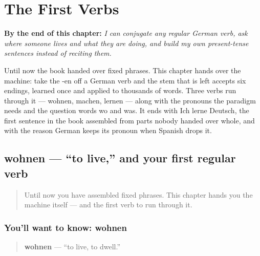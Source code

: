 
\chapter{The First Verbs}
\label{ch:first-verbs}

\begin{chapteropening}
\textbf{By the end of this chapter:} \emph{I can conjugate any regular German verb, ask where someone lives and what they are doing, and build my own present-tense sentences instead of reciting them.}

Until now the book handed over fixed phrases. This chapter hands over the machine: take the -en off a German verb and the stem that is left accepts six endings, learned once and applied to thousands of words. Three verbs run through it — wohnen, machen, lernen — along with the pronouns the paradigm needs and the question words wo and was. It ends with Ich lerne Deutsch, the first sentence in the book assembled from parts nobody handed over whole, and with the reason German keeps its pronoun when Spanish drops it.
\end{chapteropening}

\section[wohnen]{wohnen — \textquotedblleft{}to live,\textquotedblright{} and your first regular verb}

\label{lesson:GE-C05-wohnen}



\begin{quote}
Until now you have assembled fixed phrases. This chapter hands you the machine itself — and the first verb to run through it.
\end{quote}

\subsection*{You'll want to know: wohnen}
\begin{quote}
\textbf{wohnen} — \textquotedblleft{}to live, to dwell.\textquotedblright{}
\end{quote}

